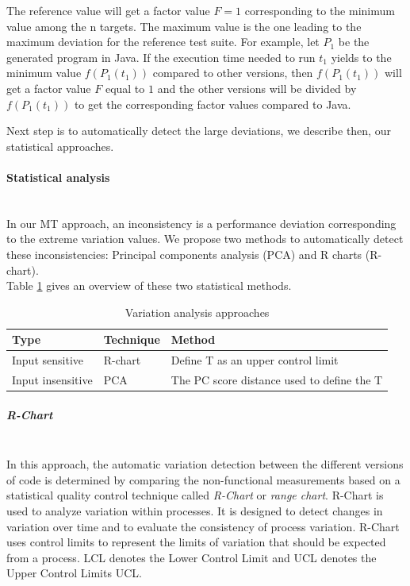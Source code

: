 The reference value will get a factor value $F = 1$ corresponding to the minimum value among the n targets. The maximum value is the one leading to the maximum deviation for the reference test suite. For example, let $P_{1}$ be the generated program in Java. If the execution time needed to run $t_{1}$ yields to the minimum value $f(P_{1}(t_{1}))$ compared to other versions, then $f(P_{1}(t_{1}))$ will get a factor value $F$ equal to $1$ and the other versions will be divided by $f(P_{1}(t_{1}))$ to get the corresponding factor values compared to Java.

Next step is to automatically detect the large deviations, we describe then, our statistical approaches.

\paragraph{Statistical analysis}~\\
 
In our MT approach, an inconsistency is a performance deviation corresponding to the extreme variation values.
We propose two methods to automatically detect these inconsistencies: Principal components analysis (PCA) and R charts (R-chart).\\
Table \ref{tab:Statistical methods} gives an overview of these two statistical methods.
\begin{table}[h]
	\centering
	
	\begin{tabular}{|l| l |l |}				
		\hline
		
		\textbf{Type} &  \textbf{Technique} &  \textbf{Method}    \\ \hline
		Input sensitive  &  R-chart &  Define T as an upper control limit  \\ \hline
		Input insensitive &  PCA &  The PC score distance used to define the T \\ \hline
	\end{tabular}
	
	\caption{Variation analysis approaches}
	\label{tab:Statistical methods}
\end{table}

\subparagraph{R-Chart}~\\
In this approach, the automatic variation detection between the different versions of code is determined by comparing the non-functional measurements based on a statistical quality control technique called \textit{R-Chart} or \textit{range chart}. 
R-Chart is used to analyze variation within processes. It is designed to detect changes in variation over time and to evaluate the consistency of process variation.
R-Chart uses control limits to represent the limits of variation that should be expected from a process. LCL denotes the Lower Control Limit and UCL denotes the Upper Control Limits UCL.
 
